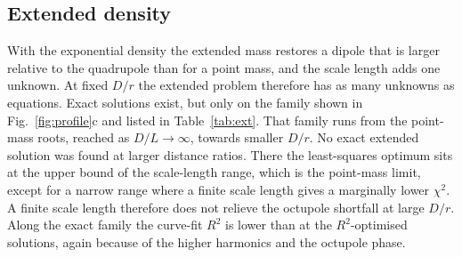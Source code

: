 \documentclass[10pt]{article}
\begin{document}
\subsection{Extended density}
With the exponential density the extended mass restores a dipole that is larger relative to the quadrupole than for a point mass, and the scale length adds one unknown. At fixed $D/r$ the extended problem therefore has as many unknowns as equations. Exact solutions exist, but only on the family shown in Fig.~\ref{fig:profile}c and listed in Table~\ref{tab:ext}. That family runs from the point-mass roots, reached as $D/L\to\infty$, towards smaller $D/r$. No exact extended solution was found at larger distance ratios. There the least-squares optimum sits at the upper bound of the scale-length range, which is the point-mass limit, except for a narrow range where a finite scale length gives a marginally lower $\chi^2$. A finite scale length therefore does not relieve the octupole shortfall at large $D/r$. Along the exact family the curve-fit $R^2$ is lower than at the $R^2$-optimised solutions, again because of the higher harmonics and the octupole phase.
\end{document}
